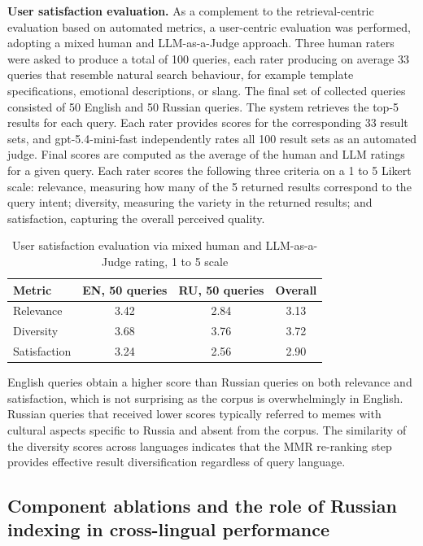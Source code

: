 \documentclass[a4paper,12pt]{article}
\begin{document}
\textbf{User satisfaction evaluation.} As a complement to the retrieval-centric evaluation based on automated metrics, a user-centric evaluation was performed, adopting a mixed human and LLM-as-a-Judge approach. Three human raters were asked to produce a total of 100 queries, each rater producing on average 33 queries that resemble natural search behaviour, for example template specifications, emotional descriptions, or slang. The final set of collected queries consisted of 50 English and 50 Russian queries. The system retrieves the top-5 results for each query. Each rater provides scores for the corresponding 33 result sets, and gpt-5.4-mini-fast independently rates all 100 result sets as an automated judge. Final scores are computed as the average of the human and LLM ratings for a given query. Each rater scores the following three criteria on a 1 to 5 Likert scale: relevance, measuring how many of the 5 returned results correspond to the query intent; diversity, measuring the variety in the returned results; and satisfaction, capturing the overall perceived quality.

\begin{table}[H]
\centering
\caption{User satisfaction evaluation via mixed human and LLM-as-a-Judge rating, 1 to 5 scale}
\label{tab:user_eval}
\begin{tabular}{|l|c|c|c|}
\hline
\textbf{Metric} & \textbf{EN, 50 queries} & \textbf{RU, 50 queries} & \textbf{Overall} \\
\hline
Relevance    & 3.42 & 2.84 & 3.13 \\
\hline
Diversity    & 3.68 & 3.76 & 3.72 \\
\hline
Satisfaction & 3.24 & 2.56 & 2.90 \\
\hline
\end{tabular}
\end{table}

English queries obtain a higher score than Russian queries on both relevance and satisfaction, which is not surprising as the corpus is overwhelmingly in English. Russian queries that received lower scores typically referred to memes with cultural aspects specific to Russia and absent from the corpus. The similarity of the diversity scores across languages indicates that the MMR re-ranking step provides effective result diversification regardless of query language.

\subsection{Component ablations and the role of Russian indexing in cross-lingual performance}
\end{document}
